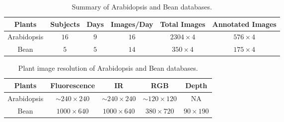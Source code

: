 

\begin{table*}[t!]
\begin{center}
\caption{Summary of Arabidopsis and Bean databases.}
\label{tab:stat}
\begin{tabular}{c|c|c|c|c|c}
      \hline
      Plants     & Subjects & Days & Images/Day & Total Images & Annotated Images \\
      \hline
      Arabidopsis &  $16$      &  $9$   &     $16$     &     $2304\times 4$     &       $576\times 4$     \\
      \hline
      Bean        &   $5$      &  $5$   &     $14$     &     $350\times 4$       &       $175\times 4$  \\
      \hline
\end{tabular}
\end{center}
\end{table*}



\begin{table*}
\begin{center}
\caption{Plant image resolution of Arabidopsis and Bean databases.}
\label{tab:resolution}
\begin{tabular}{c|c|c|c|c}
      \hline
      Plants     & Fluorescence       & IR        & RGB      & Depth     \\
      \hline
      Arabidopsis &  $\sim$$240\times240$ &  $\sim$$240\times240$  & $\sim$$120\times120$  & NA  \\
      Bean        & $1000\times640$ & $1000\times640$ & $380\times720$ & $90\times190$    \\
      \hline
\end{tabular}
\end{center}
\end{table*}
